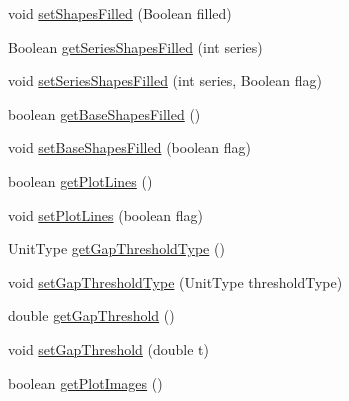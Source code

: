\begin{DoxyCompactItemize}
\item 
void \mbox{\hyperlink{classorg_1_1jfree_1_1chart_1_1renderer_1_1xy_1_1_standard_x_y_item_renderer_a691d44954b5d647c31b17a13f4886b3b}{set\+Shapes\+Filled}} (Boolean filled)
\item 
Boolean \mbox{\hyperlink{classorg_1_1jfree_1_1chart_1_1renderer_1_1xy_1_1_standard_x_y_item_renderer_ae5cd12f33b9d935c2536456218d71dcb}{get\+Series\+Shapes\+Filled}} (int series)
\item 
void \mbox{\hyperlink{classorg_1_1jfree_1_1chart_1_1renderer_1_1xy_1_1_standard_x_y_item_renderer_a65728b8867b3c99b4caa1266f2d23175}{set\+Series\+Shapes\+Filled}} (int series, Boolean flag)
\item 
boolean \mbox{\hyperlink{classorg_1_1jfree_1_1chart_1_1renderer_1_1xy_1_1_standard_x_y_item_renderer_adb39a465a8e460f4accac823465c4ab5}{get\+Base\+Shapes\+Filled}} ()
\item 
void \mbox{\hyperlink{classorg_1_1jfree_1_1chart_1_1renderer_1_1xy_1_1_standard_x_y_item_renderer_a21b566e7b0068d123fe66db1130d55ea}{set\+Base\+Shapes\+Filled}} (boolean flag)
\item 
boolean \mbox{\hyperlink{classorg_1_1jfree_1_1chart_1_1renderer_1_1xy_1_1_standard_x_y_item_renderer_ac8313f5d72c91cecb8b3f3d937624ad6}{get\+Plot\+Lines}} ()
\item 
void \mbox{\hyperlink{classorg_1_1jfree_1_1chart_1_1renderer_1_1xy_1_1_standard_x_y_item_renderer_ae909bfacd1b4e2782d23adf501ae54d6}{set\+Plot\+Lines}} (boolean flag)
\item 
Unit\+Type \mbox{\hyperlink{classorg_1_1jfree_1_1chart_1_1renderer_1_1xy_1_1_standard_x_y_item_renderer_a4f865cdfa2e07dbc33e07e496bdbad28}{get\+Gap\+Threshold\+Type}} ()
\item 
void \mbox{\hyperlink{classorg_1_1jfree_1_1chart_1_1renderer_1_1xy_1_1_standard_x_y_item_renderer_acddcdf4d9dc16b26b6d98f2f122229cd}{set\+Gap\+Threshold\+Type}} (Unit\+Type threshold\+Type)
\item 
double \mbox{\hyperlink{classorg_1_1jfree_1_1chart_1_1renderer_1_1xy_1_1_standard_x_y_item_renderer_a87116b4d4afb4c93a67c18c5c5c4c1ff}{get\+Gap\+Threshold}} ()
\item 
void \mbox{\hyperlink{classorg_1_1jfree_1_1chart_1_1renderer_1_1xy_1_1_standard_x_y_item_renderer_ab488695eeac7f7c1af80726e0fd3d0d1}{set\+Gap\+Threshold}} (double t)
\item 
boolean \mbox{\hyperlink{classorg_1_1jfree_1_1chart_1_1renderer_1_1xy_1_1_standard_x_y_item_renderer_a79f82215d7545175b35c20e06344f055}{get\+Plot\+Images}} ()

\end{DoxyCompactItemize}
